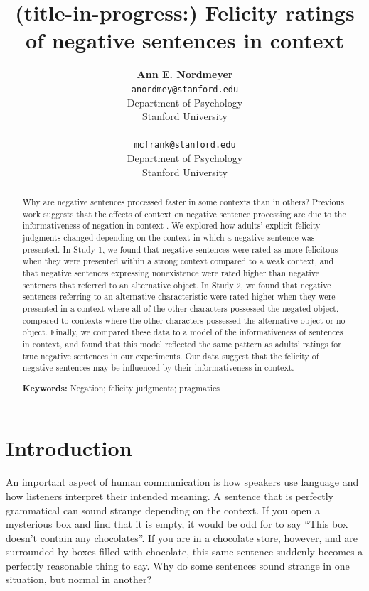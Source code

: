 \documentclass[10pt,letterpaper]{article}
\title{(title-in-progress:) Felicity ratings of negative sentences in context}
\author{{\large \bf Ann E. Nordmeyer} \\ \texttt{anordmey@stanford.edu}\\ Department of Psychology \\ Stanford University \\ 
\And {\large \bf Michael C. Frank} \\ \texttt{mcfrank@stanford.edu} \\ Department of Psychology \\ Stanford University \\ }
\begin{document}
\maketitle


\begin{abstract}
Why are negative sentences processed faster in some contexts than in others?  Previous work suggests that the effects of context on negative sentence processing are due to the informativeness of negation in context \cite{nordmeyer2014}.  We explored how adults' explicit felicity judgments changed depending on the context in which a negative sentence was presented.  In Study 1, we found that negative sentences were rated as more felicitous when they were presented within a strong context compared to a weak context, and that negative sentences expressing nonexistence were rated higher than negative sentences that referred to an alternative object.  In Study 2, we found that negative sentences referring to an alternative characteristic were rated higher when they were presented in a context where all of the other characters possessed the negated object, compared to contexts where the other characters possessed the alternative object or no object.  Finally, we compared these data to a model of the informativeness of sentences in context, and found that this model reflected the same pattern as adults' ratings for true negative sentences in our experiments.  Our data suggest that the felicity of negative sentences may be influenced by their informativeness in context.  


\textbf{Keywords:} 
Negation; felicity judgments; pragmatics
\end{abstract}

\section{Introduction}

An important aspect of human communication is how speakers use language and how listeners interpret their intended meaning.  A sentence that is perfectly grammatical can sound strange depending on the context.  If you open a mysterious box and find that it is empty, it would be odd for to say ``This box doesn't contain any chocolates''.  If you are in a chocolate store, however, and are surrounded by boxes filled with chocolate, this same sentence suddenly becomes a perfectly reasonable thing to say.  Why do some sentences sound strange in one situation, but normal in another?
\end{document}
